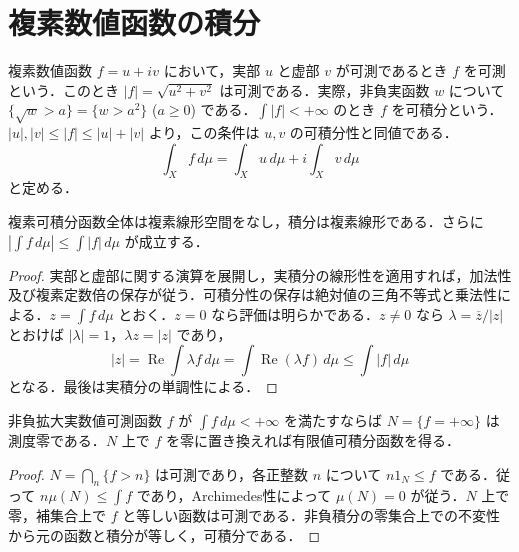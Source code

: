 \section{複素数値函数の積分}
\begin{defn}[複素可積分函数]
複素数値函数 $f=u+iv$ において，実部 $u$ と虚部 $v$ が可測であるとき $f$ を可測という．このとき $|f|=\sqrt{u^2+v^2}$ は可測である．実際，非負実函数 $w$ について $\{\sqrt w>a\}=\{w>a^2\}$ ($a\geq0$) である．$\int|f|<+\infty$ のとき $f$ を可積分という．$|u|,|v|\leq|f|\leq|u|+|v|$ より，この条件は $u,v$ の可積分性と同値である．
\[
 \int_X f\,d\mu=\int_X u\,d\mu+i\int_X v\,d\mu
\]
と定める．
\end{defn}
\begin{prop}[複素積分の線形性と評価]
複素可積分函数全体は複素線形空間をなし，積分は複素線形である．さらに $\left|\int f\,d\mu\right|\leq\int|f|\,d\mu$ が成立する．
\end{prop}
\begin{proof}
実部と虚部に関する演算を展開し，実積分の線形性を適用すれば，加法性及び複素定数倍の保存が従う．可積分性の保存は絶対値の三角不等式と乗法性による．$z=\int f\,d\mu$ とおく．$z=0$ なら評価は明らかである．$z\ne0$ なら $\lambda=\overline z/|z|$ とおけば $|\lambda|=1$，$\lambda z=|z|$ であり，
\[
 |z|=\operatorname{Re}\int\lambda f\,d\mu
 =\int\operatorname{Re}(\lambda f)\,d\mu\leq\int|f|\,d\mu
\]
となる．最後は実積分の単調性による．
\end{proof}
\begin{prop}[有限積分を持つ拡大実函数]
非負拡大実数値可測函数 $f$ が $\int f\,d\mu<+\infty$ を満たすならば $N=\{f=+\infty\}$ は測度零である．$N$ 上で $f$ を零に置き換えれば有限値可積分函数を得る．
\end{prop}
\begin{proof}
$N=\bigcap_n\{f>n\}$ は可測であり，各正整数 $n$ について $n1_N\leq f$ である．従って $n\mu(N)\leq\int f$ であり，Archimedes性によって $\mu(N)=0$ が従う．$N$ 上で零，補集合上で $f$ と等しい函数は可測である．非負積分の零集合上での不変性から元の函数と積分が等しく，可積分である．
\end{proof}
